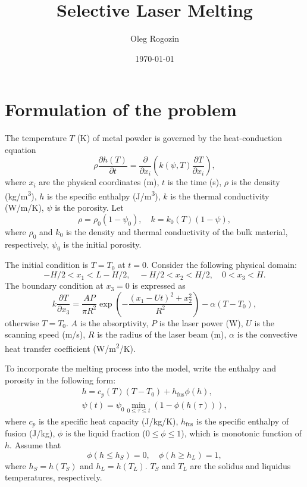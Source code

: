 \documentclass{article}
\title{Selective Laser Melting}
\date{\today}
\author{Oleg Rogozin}
\newcommand{\pder}[2][]{\frac{\partial#1}{\partial#2}}
\newcommand{\fusion}[1]{{#1}_\mathrm{fus}}
\begin{document}
\maketitle

\section{Formulation of the problem}

The temperature \(T\) (\si{K}) of metal powder is governed by the heat-conduction equation
\begin{equation}\label{eq:heat_conduction}
	\rho\pder[h(T)]{t} = \pder{x_i}\left(k(\psi,T)\pder[T]{x_i}\right),
\end{equation}
where \(x_i\) are the physical coordinates (\si{m}), \(t\) is the time (\si{s}),
\(\rho\) is the density (\si{kg/m^3}), \(h\) is the specific enthalpy (\si{J/m^3}),
\(k\) is the thermal conductivity (\si{W/m/K}), \(\psi\) is the porosity. Let
\begin{equation}\label{eq:porosity_variables}
	\rho = \rho_0(1-\psi_0), \quad k = k_0(T)(1-\psi),
\end{equation}
where \(\rho_0\) and \(k_0\) is the density and thermal conductivity of the bulk material, respectively,
\(\psi_0\) is the initial porosity.

The initial condition is \(T=T_0\) at \(t=0\).
Consider the following physical domain:
\begin{equation}
	-H/2 < x_1 < L-H/2, \quad -H/2 < x_2 < H/2, \quad 0 < x_3 < H.
\end{equation}
The boundary condition at \(x_3=0\) is expressed as
\begin{equation}\label{eq:bc}
	k\pder[T]{x_3} = \frac{AP}{\pi R^2}\exp\left(-\frac{(x_1-Ut)^2 + x_2^2}{R^2}\right) - \alpha(T-T_0),
\end{equation}
otherwise \(T = T_0\).
\(A\) is the absorptivity, \(P\) is the laser power (\si{W}), \(U\) is the scanning speed (\si{m/s}),
\(R\) is the radius of the laser beam (\si{m}), \(\alpha\) is the convective heat transfer coefficient (\si{W/m^2/K}).

To incorporate the melting process into the model, write the enthalpy and porosity in the following form:
\begin{gather}
	h = c_p(T)(T-T_0) + \fusion{h}\phi(h), \label{eq:enthalpy} \\
	\psi(t) = \psi_0\min_{0\leq\tau\leq t}\left( 1-\phi(h(\tau)) \right), \label{eq:porosity}
\end{gather}
where \(c_p\) is the specific heat capacity (\si{J/kg/K}),
\(\fusion{h}\) is the specific enthalpy of fusion (\si{J/kg}),
\(\phi\) is the liquid fraction (\(0 \leq \phi \leq 1\)), which is monotonic function of \(h\).
Assume that \[ \phi(h\leq h_S) = 0, \quad \phi(h\geq h_L) = 1,\]
where \(h_S = h(T_S)\) and \(h_L = h(T_L)\).
\(T_S\) and \(T_L\) are the solidus and liquidus temperatures, respectively.
\end{document}
